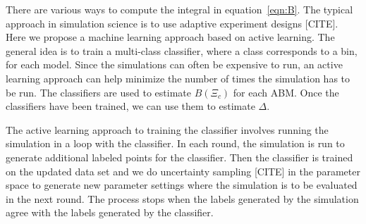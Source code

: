 There are various ways to compute the integral in equation~\ref{eqn:B}. The typical approach in simulation
science is to use adaptive experiment designs [CITE]. Here we propose a machine learning approach based on active learning. The general idea is to train a multi-class classifier, where a class corresponds to a bin, for each model. Since the simulations can often be expensive to run, an active learning approach can help minimize the number of times the simulation has to be run.
The classifiers are used to estimate $B(\Xi_{c})$ for each ABM.
Once the classifiers have been trained, we can use them to estimate $\Delta$.

The active learning approach to training the classifier involves running the simulation in a loop with the classifier. In each round, the simulation is run to generate additional labeled points for the classifier. Then the classifier is trained on the updated data set and we do uncertainty sampling [CITE] in the parameter space to generate new parameter settings where the simulation is to be evaluated in the next round. The process stops when the labels generated by the simulation agree with the labels generated by the classifier.